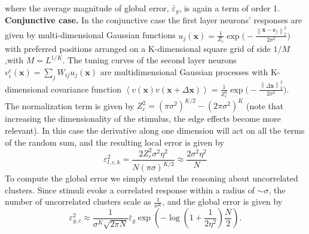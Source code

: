 \documentclass[a4paper]{article}%
\begin{document}
where the average magnitude of global error, $\bar{\varepsilon}_{g}$, is again
a term of order 1. 
\newline\newline
\textbf{Conjunctive case.} In the
conjunctive case the first layer neurons' responses are given by
multi-dimensional Gaussian functions $u_{j}(\mathbf{x}) =\frac{1}{Z_{c}}
\exp{\Big(-\frac{\left\|  \mathbf{x}-\mathbf{c}_{j}\right\| _{2}^{2}}
{2\sigma^{2}}\Big)}$ with preferred positions arranged on a K-dimensional
square grid of side $1/M$ ,with $M = L^{1/K}$. The tuning curves of the second
layer neurons $v^{c}_{i}(\mathbf{x}) = \sum_{j} W_{ij} u_{j}(\mathbf{x})$ are
multidimensional Gaussian processes with K-dimensional covariance function
$\left\langle v(\mathbf{x})v(\mathbf{x} + \Delta\mathbf{x}) \right\rangle = \frac{1}{Z_{c}^{2}}
\exp{\Big(-\frac{\left\| \Delta\mathbf{x}\right\| _{2}^{2}}{2\sigma^{2}}
\Big)}$. The normalization term is given by $Z_{c}^{2} = (\pi\sigma^{2})^{K/2}
- (2\pi\sigma^{2})^{K}$ (note that increasing the dimensionality of the
stimulus, the edge effects become more relevant). In this case the derivative
along one dimension will act on all the terms of the random sum, and the
resulting local error is given by
\begin{equation}
\varepsilon_{l,c,k}^{2} = \frac{2Z_{c}^{2} \sigma^{2} \eta^{2}}{N(\pi
\sigma)^{K/2}} \approx\frac{2\sigma^{2} \eta^{2}}{N}
\end{equation}
To compute the global error we simply extend the reasoning about uncorrelated
clusters. Since stimuli evoke a correlated response within a radius of
$\sim\sigma$, the number of uncorrelated clusters scale as $\frac{1}
{\sigma^{K}}$, and the global error is given by
\begin{equation}
\varepsilon_{g,c}^{2} \approx\frac{1}{\sigma^{K}\sqrt{2\pi
N}}\bar{\varepsilon}_{g} \exp{\left(-\log\left(1 + \frac{1}{2\eta^{2}}\right)\frac{N}{2} \right)}.
\label{Eq:multi-global-conj}
\end{equation}
\end{document}

